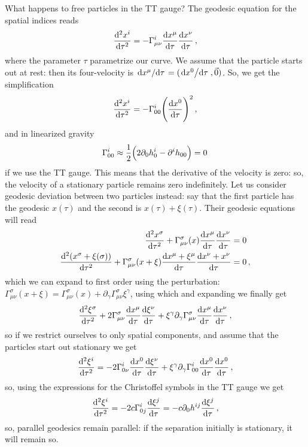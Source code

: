 \documentclass[main.tex]{subfiles}
\begin{document}
What happens to free particles in the TT gauge? The geodesic equation for the spatial indices reads 
%
\begin{align}
\dv[2]{x^{i}}{\tau} = - \Gamma^{i}_{\mu \nu } \dv{x^{\mu }}{\tau } \dv{x^{\nu }}{\tau }
\,,
\end{align}
%
where the parameter \(\tau \) parametrize our curve. 
We assume that the particle starts out at rest: then its four-velocity is \(\dv*{x^{\mu }}{\tau } = (\dv*{x^{0}}{\tau }, \vec{0})\). So, we get the simplification 
%
\begin{align}
  \dv[2]{x^{i}}{\tau} =
  - \Gamma^{i}_{00} \qty(\dv{x^{0}}{\tau })^2
\,,
\end{align}
%
and in linearized gravity  
%
\begin{align}
\Gamma^{i}_{00} \approx \frac{1}{2} \qty(2 \partial_0 h^{i}_{0} - \partial^{i} h_{00} ) =0
\,
\end{align}
%
if we use the TT gauge. 
This means that the derivative of the velocity is zero: so, the velocity of a stationary particle remains zero indefinitely. 
Let us consider geodesic deviation between two particles instead: say that the first particle has the geodesic \(x(\tau )\) and the second is \(x(\tau ) + \xi (\tau )\). Their geodesic equations will read 
%
\begin{align}
\dv[2]{x^{\sigma }}{\tau } + \Gamma^{\sigma }_{\mu \nu } (x) \dv{x^{\mu  }}{\tau } \dv{x^{\nu }}{\tau } &= 0 \\
\dv[2]{(x^{\sigma } + \xi (\sigma )) }{\tau } + \Gamma^{\sigma }_{\mu \nu } (x + \xi ) \dv{x^{\mu  } + \xi^{\mu }}{\tau } \dv{x^{\nu } + x^{\nu }}{\tau } &= 0 
\,,
\end{align}
%
 which we can expand to first order using the perturbation: \(\Gamma^{\sigma }_{\mu \nu } (x + \xi ) = \Gamma^{\sigma }_{\mu \nu } (x) + \partial_{\gamma } \Gamma^{\sigma }_{\mu \nu } \xi^{\gamma } \), using which and expanding we finally get 
 \begin{align}
 \dv[2]{\xi^{\sigma }}{\tau } + 2 \Gamma^{\sigma}_{\mu \nu } \dv{x^{\mu }}{\tau } \dv{\xi^{\nu }}{\tau } + \xi^{\gamma } \partial_{\gamma } \Gamma^{\sigma}_{\mu \nu } \dv{x^{\mu }}{\tau } \dv{x^{\nu }}{\tau }
 \,,
 \end{align}
 so if we restrict ourselves to only spatial components, and assume that the particles start out stationary we get 
 \begin{align}
 \dv[2]{\xi ^{i}}{\tau } = - 2 \Gamma^{i}_{0 \nu } \dv{x^{0}}{\tau } \dv{\xi^{\nu }}{\tau } + \xi^{\gamma  } \partial_{\gamma } \Gamma^{i}_{00} \dv{x^{0}}{\tau }  \dv{x^{0}}{\tau }
 \,,
 \end{align}
so, using the expressions for the Christoffel symbols in the TT gauge we get 
%
\begin{align}
\dv[2]{\xi^{i}}{\tau } = - 2 c \Gamma^{i}_{0j} \dv{\xi^{j}}{\tau } = -c \partial_0  h^{ij} \dv{\xi^{j}}{\tau }
\,,
\end{align}
%
so, parallel geodesics remain parallel: if the separation initially is stationary, it will remain so. 
\end{document}
